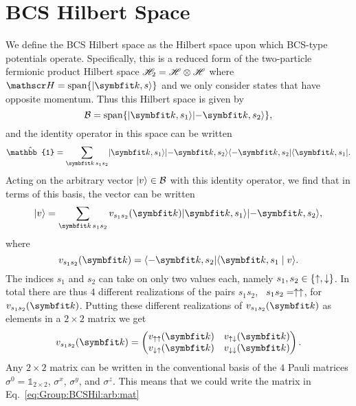 \section{BCS Hilbert Space}
\label{sec:Group:BCSHil}
We define the BCS Hilbert space as the Hilbert space upon which BCS-type potentials operate. Specifically, this is a reduced form of the two-particle
fermionic product Hilbert space $\mathscr{H}_2 = \mathscr{H}\otimes\mathscr{H}$ where $\hil = \Span\{\ket{\v{k},s}\}$ and we only consider states that have opposite momentum.
Thus this Hilbert space is given by 
\begin{equation}
    \label{eq:Group:BCSHil:space}
    \mathcal{B} = \Span\{\ket{\v{k},s_1}\ket{-\v{k},s_2}\},
\end{equation}
and the identity operator in this space can be written
\begin{equation}
    \label{eq:Group:BCSHil:id}
    \hat{\mathbb{1}} = \sum_{\v{k}\,s_1s_2}\ket{\v{k},s_1}\ket{-\v{k},s_2}\bra{-\v{k},s_2}\bra{\v{k},s_1}.
\end{equation}
Acting on the arbitrary vector $\lvert v \rangle\in\mathcal{B}$ with this identity operator, we find that in terms of this basis, the vector can be written
\begin{equation}
    \label{eq:Group:BCSHil:arbitrary}
    \ket{v} = \sum_{\v{k}\,s_1s_2}v_{s_1s_2}(\v{k})\ket{\v{k},s_1}\ket{-\v{k},s_2},
\end{equation}
where
\begin{equation}
    \label{eq:Group:BCSHil:arbitrary:coeff}
    v_{s_1s_2}(\v{k}) = \bra{-\v{k},s_2}\braket{\v{k},s_1}{v}.
\end{equation}
The indices $s_1$ and $s_2$ can take on only two values each, namely $s_1,s_2\in\{\uparrow,\downarrow\}$. In total there are thus $4$ different realizations
of the pairs $s_1s_2$, \eg\ $s_1s_2=\uparrow\uparrow$, for $v_{s_1s_2}(\v{k})$. Putting these different realizations of $v_{s_1s_2}(\v{k})$ as elements in a $2\times2$ matrix
we get
\begin{equation}
    \label{eq:Group:BCSHil:arb:mat}
    v_{s_1s_2}(\v{k}) =
    \begin{pmatrix}
        v_{\up\up}(\v{k}) & v_{\up\dn}(\v{k})\\
        v_{\dn\up}(\v{k}) & v_{\dn\dn}(\v{k})
    \end{pmatrix}.
\end{equation}
Any $2\times 2$ matrix can be written in the conventional basis of the $4$ Pauli matrices $\sigma^0 = \mathbb{1}_{2\times 2}$, $\sigma^x$, $\sigma^y$,
and $\sigma^z$. This means that we could write the matrix in Eq.~\eqref{eq:Group:BCSHil:arb:mat}
